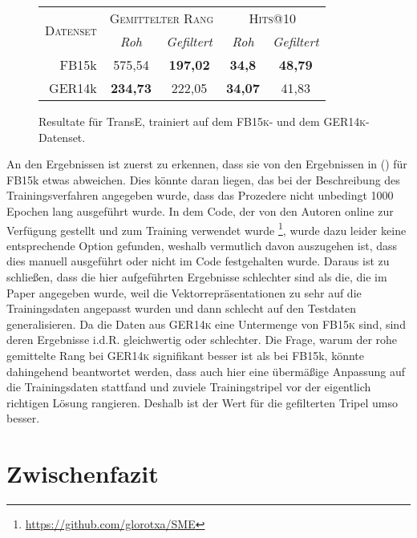 \begin{figure}[h]
  \centering
  \begin{tabular}{r||cc|cc}
    \multirow{2}{*}{\textsc{Datenset}} & \multicolumn{2}{c|}{\textsc{Gemittelter Rang}} & \multicolumn{2}{c}{\textsc{Hits@10}} \\
     & \emph{Roh} & \emph{Gefiltert} & \emph{Roh} & \emph{Gefiltert} \\
     \hline
     FB15k & 575,54 & \textbf{197,02} & \textbf{34,8} & \textbf{48,79} \\
     GER14k & \textbf{234,73} & 222,05 & \textbf{34,07} & 41,83 \\

  \end{tabular}
  \caption[Resultate für TransE mit \textsc{FB15k} und \textsc{GER14k}]{Resultate für TransE, trainiert auf dem \textsc{FB15k}- und dem \textsc{GER14k}-Datenset.\label{fig:results1}}
\end{figure}

An den Ergebnissen ist zuerst zu erkennen, dass sie von den Ergebnissen in (\cite{bordes2013translating}) für FB15k etwas abweichen.
Dies könnte daran liegen, das bei der Beschreibung des Trainingsverfahren angegeben wurde, dass das Prozedere
nicht unbedingt 1000 Epochen lang ausgeführt wurde. In dem Code, der von den Autoren online zur Verfügung gestellt und
zum Training verwendet wurde
\footnote{\url{https://github.com/glorotxa/SME}}, wurde dazu leider keine entsprechende Option gefunden, weshalb vermutlich davon auszugehen
ist, dass dies manuell ausgeführt oder nicht im Code festgehalten wurde.
Daraus ist zu schließen, dass die hier aufgeführten Ergebnisse schlechter sind als die,
die im Paper angegeben wurde, weil die Vektorrepräsentationen zu sehr auf die Trainingsdaten angepasst wurden und dann schlecht
auf den Testdaten generalisieren. Da die Daten aus \textsc{GER14k} eine Untermenge von \textsc{FB15k} sind, sind deren Ergebnisse
i.d.R. gleichwertig oder schlechter. Die Frage, warum der rohe gemittelte Rang bei \textsc{GER14k} signifikant besser ist als
bei FB15k, könnte dahingehend beantwortet werden, dass auch hier eine übermäßige Anpassung auf die Trainingsdaten stattfand und
zuviele Trainingstripel vor der eigentlich richtigen Lösung rangieren. Deshalb ist der Wert für die gefilterten Tripel umso
besser.

\section{Zwischenfazit}

